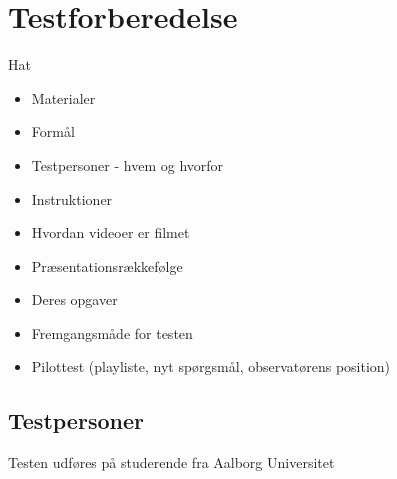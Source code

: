 \section{Testforberedelse}
\label{Testforberedelse}
%
Hat
%
\begin{itemize}
  \item Materialer
  \item Formål
  \item Testpersoner - hvem og hvorfor
  \item Instruktioner
  \item Hvordan videoer er filmet
  \item Præsentationsrækkefølge 
  \item Deres opgaver
  \item Fremgangsmåde for testen 
  \item Pilottest (playliste, nyt spørgsmål, observatørens position)
\end{itemize}
%

\subsection{Testpersoner}
\label{TestpersonerValgAfGestikker}
%
Testen udføres på studerende fra Aalborg Universitet